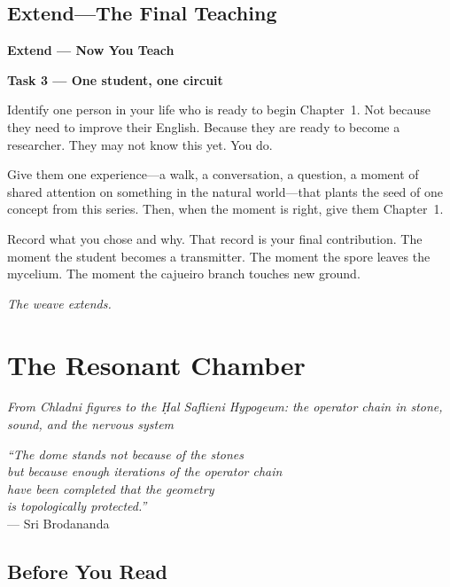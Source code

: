 \documentclass[11pt, twoside, openright]{book}
\theoremstyle{plain}
\theoremstyle{definition}
\newenvironment{extendbox}{%
  \begin{mdframed}[backgroundcolor=ExtendBox,linecolor=violet!70,linewidth=0.5pt,innertopmargin=6pt,innerbottommargin=6pt]
  \noindent\textbf{Extend --- Now You Teach}\par\medskip}{\end{mdframed}}
\begin{document}
\section{Extend---The Final Teaching}

\begin{extendbox}
\textbf{Task 3 --- One student, one circuit}

Identify one person in your life who is ready to begin Chapter~1.
Not because they need to improve their English. Because they are ready
to become a researcher. They may not know this yet. You do.

Give them one experience---a walk, a conversation, a question, a
moment of shared attention on something in the natural world---that
plants the seed of one concept from this series. Then, when the moment
is right, give them Chapter~1.

Record what you chose and why. That record is your final contribution.
The moment the student becomes a transmitter. The moment the spore
leaves the mycelium. The moment the cajueiro branch touches new ground.

\textit{The weave extends.}
\end{extendbox}

\chapter{The Resonant Chamber}
\textit{From Chladni figures to the \d{H}al Saflieni Hypogeum:
the operator chain in stone, sound, and the nervous system}

\begin{flushright}
\textit{``The dome stands not because of the stones\\
but because enough iterations of the operator chain\\
have been completed that the geometry\\
is topologically protected.''}\\
--- Sri Brodananda
\end{flushright}

\section{Before You Read}
\end{document}
